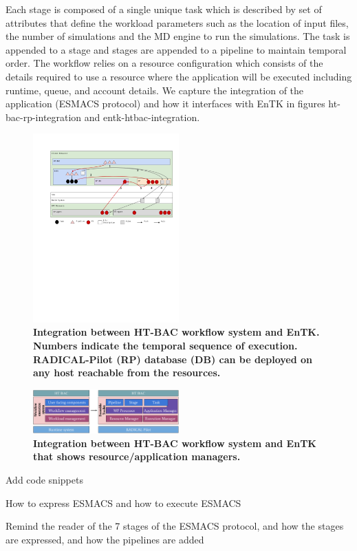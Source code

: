 Each stage is composed of a single unique task which is described by set of attributes that define the workload parameters such as the location of input files, the number of simulations and the MD engine to run the simulations. The task is appended to a stage and stages are appended to a pipeline to maintain temporal order. The workflow relies on a resource configuration which consists of the details required to use a resource where the application will be executed including runtime, queue, and account details. We capture the integration of the application (ESMACS protocol) and how it interfaces with EnTK in figures ht-bac-rp-integration and entk-htbac-integration. 

\begin{figure}[tb]
\centering
  \includegraphics[width=0.5\textwidth]{FIGURES/ht-bac-rp_integration.pdf}
  \caption{\bf Integration between HT-BAC workflow system and EnTK. Numbers indicate the temporal sequence of execution. RADICAL-Pilot (RP) database (DB) can be deployed on any host reachable from the resources.}
   \label{figure:ht-bac_rp}
\end{figure}

\begin{figure}[tb]
\centering
  \includegraphics[width=0.5\textwidth]{FIGURES/entk_htbac_integration.pdf}
  \caption{\bf Integration between HT-BAC workflow system and EnTK that shows resource/application managers.}
   \label{figure:ht-bac_entk}
\end{figure}

Add code snippets 

How to express ESMACS and how to execute ESMACS


Remind the reader of the 7 stages of the ESMACS protocol, and how the stages are expressed, and how the pipelines are added 


